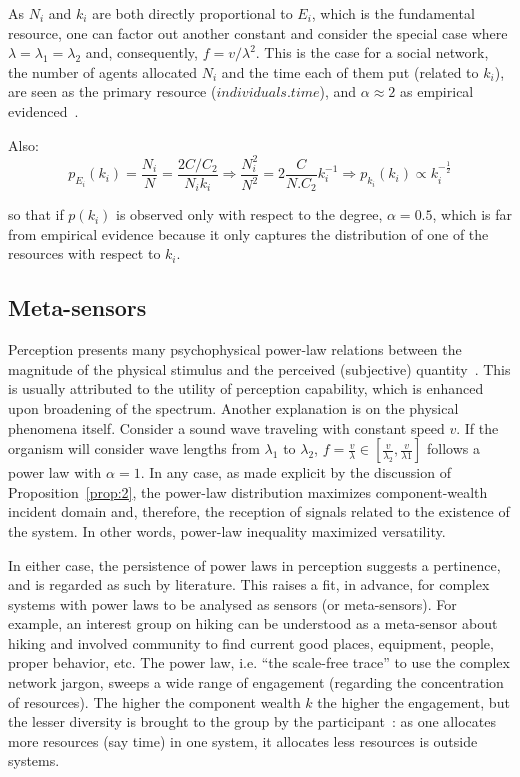 \documentclass[a4paper, 11pt]{article} %
\begin{document}
As $N_i$ and $k_i$ are both directly proportional to $E_i$, which is the fundamental resource, one can factor out another constant and consider the special case where $\lambda=\lambda_1=\lambda_2$ and, consequently, $f=v/\lambda^2$. This is the case for a social network, the number of agents allocated $N_i$ and the time each of them put (related to $k_i$), are seen as the primary resource ($individuals . time$), and $\alpha\approx 2$
as empirical evidenced~\cite{newman}.

Also:
\begin{equation}\label{eq:eqf}
	p_{E_i}(k_i)=\frac{N_i}{N}=\frac{2C/C_2}{N_i k_i} \Rightarrow \frac{N_i^2}{N^2}=2\frac{C}{N.C_2}k_i^{-1} \Rightarrow p_{k_i}(k_i)\propto k_i^{-\frac{1}{2}}
\end{equation}

\noindent so that if $p(k_i)$ is observed only with respect to the degree, 
$\alpha=0.5$,
which is far from empirical evidence because it only captures the distribution
of one of the resources with respect to $k_i$.

\subsection{Meta-sensors}
Perception presents many psychophysical power-law 
relations between the
magnitude of the physical stimulus and the perceived 
(subjective) quantity~\cite{pbook}.
This is usually attributed to the utility of perception capability,
which is enhanced upon broadening of the spectrum.
Another explanation is on the physical phenomena itself.
Consider a sound wave traveling with constant speed $v$.
If the organism will consider wave lengths from $\lambda_1$
to $\lambda_2$, $f=\frac{v}{\lambda} \in [\frac{v}{\lambda_2},\frac{v}{\lambda1}]$ follows
a power law with $\alpha=1$.
In any case, as made explicit by the discussion of
Proposition~\ref{prop:2}, the power-law distribution
maximizes component-wealth incident domain and,
therefore, the reception of signals related to the existence
of the system. In other words, power-law inequality
maximized versatility.

In either case, the persistence of power laws in perception
suggests a pertinence, and is regarded as such by literature.
This raises
a fit, in advance, for complex systems with power laws
to be analysed as sensors (or meta-sensors).
For example, an interest group on hiking can be understood as
a meta-sensor about hiking and involved community to find current good
places, equipment, people, proper behavior, etc.
The power law, i.e. ``the scale-free trace'' to use
the complex network jargon, sweeps a wide
range of engagement (regarding the concentration of resources).
The higher the component wealth $k$ the higher the engagement,
but the lesser diversity is brought to the group
by the participant~\cite{tStable}: 
as one allocates more resources (say time)
in one system,
it allocates less resources is outside systems.
\end{document}
